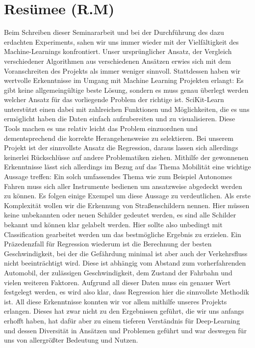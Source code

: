 \chapter{Resümee (R.M)}
\label{resümee}
Beim Schreiben dieser Seminararbeit und bei der Durchführung des dazu erdachten Experiments, sahen wir uns immer wieder mit der Vielfältigkeit des Machine-Learnings konfrontiert. 
Unser ursprünglicher Ansatz, der Vergleich verschiedener Algorithmen aus verschiedenen Ansätzen erwies sich mit dem Voranschreiten des Projekts als immer weniger sinnvoll.
Stattdessen haben wir wertvolle Erkenntnisse im Umgang mit Machine Learning Projekten erlangt:
Es gibt keine allgemeingültige beste Lösung, sondern es muss genau überlegt werden welcher Ansatz für das vorliegende Problem der richtige ist. SciKit-Learn unterstützt einen dabei mit zahlreichen Funktionen und Möglichkeiten, die es uns ermöglicht haben die Daten einfach aufzubereiten und zu visualisieren. Diese Tools machen es uns relativ leicht das Problem einzuordnen und dementsprechend die korrekte Herangehensweise zu selektieren.
Bei unserem Projekt ist der sinnvollste Ansatz die Regression, daraus lassen sich allerdings keinerlei Rückschlüsse auf andere Problematiken ziehen.
Mithilfe der gewonnenen Erkenntnisse lässt sich allerdings im Bezug auf das Thema Mobilität eine wichtige Aussage treffen: 
Ein solch umfassendes Thema wie zum Beispiel Autonomes Fahren muss sich aller Instrumente bedienen um ansatzweise abgedeckt werden zu können. Es folgen einige Exempel um diese Aussage zu verdeutlichen.
Als erste Komplexität wollen wir die Erkennung von Straßenschildern nennen. Hier müssen keine unbekannten oder neuen Schilder gedeutet werden, es sind alle Schilder bekannt und können klar gelabelt werden. Hier sollte also unbedingt mit Classification gearbeitet werden um das bestmögliche Ergebnis zu erzielen.
Ein Präzedenzfall für Regression wiederum ist die Berechnung der besten Geschwindigkeit, bei der die Gefährdung minimal ist aber auch der Verkehrsfluss nicht beeinträchtigt wird. Diese ist abhängig vom Abstand zum vorherfahrenden Automobil, der zulässigen Geschwindigkeit, dem Zustand der Fahrbahn und vielen weiteren Faktoren. Aufgrund all dieser Daten muss ein genauer Wert festgelegt werden, es wird also klar, dass Regression hier die sinnvollste Methodik ist. 
All diese Erkenntnisse konnten wir vor allem mithilfe unseres Projekts erlangen. Dieses hat zwar nicht zu den Ergebnissen geführt, die wir uns anfangs erhofft haben, hat dafür aber zu einem tieferen Verständnis für Deep-Learning und dessen Diversität in Ansätzen und Problemen geführt und war deswegen für uns von allergrößter Bedeutung und Nutzen.





































